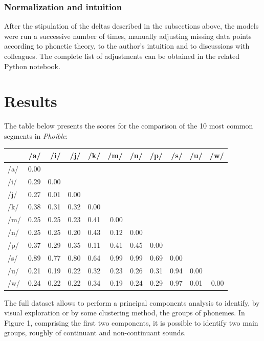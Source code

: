 \documentclass[a4paper]{article}
\begin{document}
\subsubsection{Normalization and
intuition}\label{normalization-and-intuition}

After the stipulation of the deltas described in the subsections above,
the models were run a successive number of times, manually adjusting
missing data points according to phonetic theory, to the author's
intuition and to discussions with colleagues. The complete list of
adjustments can be obtained in the related Python notebook.

\section{Results}\label{results}

The table below presents the scores for the comparison of the 10 most
common segments in \emph{Phoible}:

\begin{longtable}[c]{@{}lrrrrrrrrrr@{}}
\toprule
& /a/ & /i/ & /j/ & /k/ & /m/ & /n/ & /p/ & /s/ & /u/ & /w/\tabularnewline
\midrule
\endhead
/a/ & 0.00 & & & & & & & & &\tabularnewline
/i/ & 0.29 & 0.00 & & & & & & & &\tabularnewline
/j/ & 0.27 & 0.01 & 0.00 & & & & & & &\tabularnewline
/k/ & 0.38 & 0.31 & 0.32 & 0.00 & & & & & &\tabularnewline
/m/ & 0.25 & 0.25 & 0.23 & 0.41 & 0.00 & & & & &\tabularnewline
/n/ & 0.25 & 0.25 & 0.20 & 0.43 & 0.12 & 0.00 & & & &\tabularnewline
/p/ & 0.37 & 0.29 & 0.35 & 0.11 & 0.41 & 0.45 & 0.00 & & &\tabularnewline
/s/ & 0.89 & 0.77 & 0.80 & 0.64 & 0.99 & 0.99 & 0.69 & 0.00 &
&\tabularnewline
/u/ & 0.21 & 0.19 & 0.22 & 0.32 & 0.23 & 0.26 & 0.31 & 0.94 & 0.00
&\tabularnewline
/w/ & 0.24 & 0.22 & 0.22 & 0.34 & 0.19 & 0.24 & 0.29 & 0.97 & 0.01 &
0.00\tabularnewline
\bottomrule
\end{longtable}

The full dataset allows to perform a principal components analysis to
identify, by visual exploration or by some clustering method, the groups
of phonemes. In Figure 1, comprising the first two components, it is
possible to identify two main groups, roughly of continuant and
non-continuant sounds.
\end{document}
